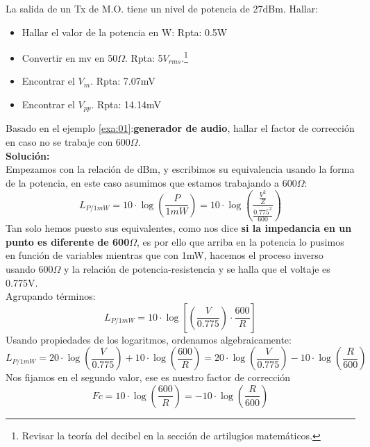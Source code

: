 \documentclass[
	12pt, %
	fleqn, %
	a4paper, %
]{LegrandOrangeBook}
\begin{document}
\begin{exercise}
La salida de un Tx de M.O. tiene un nivel de potencia de 27dBm. Hallar:
\begin{itemize}
\item Hallar el valor de la potencia en W: Rpta: 0.5W
\item Convertir en mv en 50$\Omega$. Rpta: 5$V_{rms}$.\footnote{Revisar la teoría del decibel en la sección de artilugios matemáticos.}
\item Encontrar el $V_m$. Rpta: 7.07mV
\item Encontrar el $V_{pp}$. Rpta: 14.14mV
\end{itemize}
\end{exercise}
\begin{example}
Basado en el ejemplo \ref{exa:01}:\textbf{generador de audio}, hallar el factor de corrección en caso no se trabaje con 600$\Omega$.\\
\textbf{Solución:}\\
Empezamos con la relación de dBm, y escribimos su equivalencia usando la forma de la potencia, en este caso asumimos que estamos trabajando a 600$\Omega$:
\begin{displaymath}
L_{P/1mW}=10\cdot\log\left(\frac{P}{1mW}\right)=10\cdot\log\left(\frac{\frac{V^2}{Z}}{\frac{0.775^2}{600}}\right)
\end{displaymath}
Tan solo hemos puesto sus equivalentes, como nos dice \textbf{si la impedancia en un punto es diferente de 600$\Omega$}, es por ello que arriba en la potencia lo pusimos en función de variables mientras que con 1mW, hacemos el proceso inverso usando 600$\Omega$ y la relación de potencia-resistencia y se halla que el voltaje es 0.775V.\\Agrupando términos:
\begin{displaymath}
L_{P/1mW}=10\cdot\log\left[\left(\frac{V}{0.775}\right)\cdot\frac{600}{R}\right]
\end{displaymath}
Usando propiedades de los logaritmos, ordenamos algebraicamente:
\begin{displaymath}
L_{P/1mW}=20\cdot\log\left(\frac{V}{0.775}\right)+10\cdot\log\left(\frac{600}{R}\right)=20\cdot\log\left(\frac{V}{0.775}\right)-10\cdot\log\left(\frac{R}{600}\right)
\end{displaymath}
Nos fijamos en el segundo valor, ese es nuestro factor de corrección
\begin{equation*}
\boxed{Fc=10\cdot\log\left(\frac{600}{R}\right)=-10\cdot\log\left(\frac{R}{600}\right)}
\end{equation*}
\end{example}
\end{document}

